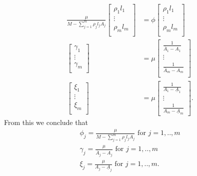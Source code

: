 \begin{align*}
\frac{\mu}{M-\sum\limits_{j=1}^m\rho_jl_jA_j}
\begin{bmatrix}
\rho_1l_1 \\
\vdots \\
\rho_ml_m\\
\end{bmatrix} &= \phi
\begin{bmatrix}
\rho_1l_1 \\
\vdots \\
\rho_ml_m\\
\end{bmatrix}\\
\begin{bmatrix}
\gamma_1 \\
\vdots \\
\gamma_m\\
\end{bmatrix} &= \mu
\begin{bmatrix}
\frac{1}{\overline{A}_1-A_1} \\
\vdots \\
\frac{1}{\overline{A}_m-A_m}\\
\end{bmatrix}\\
\begin{bmatrix}
\xi_1 \\
\vdots \\
\xi_m\\
\end{bmatrix} 
&= \mu
\begin{bmatrix}
\frac{1}{A_1-\underline{A}_1} \\
\vdots \\
\frac{1}{A_m-\underline{A}_m}
\end{bmatrix}.
\end{align*}
From this we conclude that
\begin{align*}
\phi_j = \frac{\mu}{M-\sum\limits_{j=1}^m\rho_jl_jA_j} \text{ for } j = 1,..,m \\
\gamma_j = \frac{\mu}{\overline{A}_j-A_j} \text{ for } j = 1,..,m \\
\xi_j = \frac{\mu}{A_j-\underline{A}_j} \text{ for } j = 1,..,m.
\end{align*}